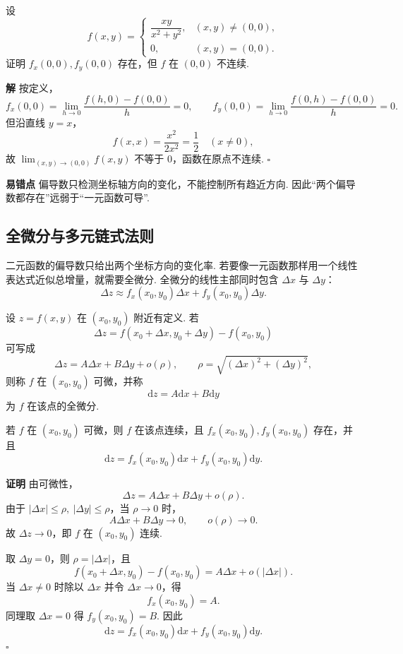 \documentclass[fontset=fandol]{ctexart}
\newenvironment{proofdetail}{\par\noindent\textbf{证明}\quad}{\hfill$\square$\par\vspace{0.8em}}
\newenvironment{solution}{\par\noindent\textbf{解}\quad}{\hfill$\square$\par\vspace{0.8em}}
\newenvironment{warning}{\par\noindent\textbf{易错点}\quad}{\par\vspace{0.8em}}
\newcommand{\dd}{\mathrm{d}}
\begin{document}
\begin{example}[偏导存在不推出连续]
设
\[
f(x,y)=
\begin{cases}
\dfrac{xy}{x^2+y^2},&(x,y)\neq(0,0),\\[0.6em]
0,&(x,y)=(0,0).
\end{cases}
\]
证明 $f_x(0,0),f_y(0,0)$ 存在，但 $f$ 在 $(0,0)$ 不连续.
\end{example}
\begin{solution}
按定义，
\[
f_x(0,0)=\lim_{h\to0}\frac{f(h,0)-f(0,0)}{h}=0,\qquad
f_y(0,0)=\lim_{h\to0}\frac{f(0,h)-f(0,0)}{h}=0.
\]
但沿直线 $y=x$，
\[
f(x,x)=\frac{x^2}{2x^2}=\frac12\quad(x\neq0),
\]
故 $\lim_{(x,y)\to(0,0)}f(x,y)$ 不等于 $0$，函数在原点不连续.
\end{solution}
\begin{warning}
偏导数只检测坐标轴方向的变化，不能控制所有趋近方向. 因此“两个偏导数都存在”远弱于“一元函数可导”.
\end{warning}

\subsection{全微分与多元链式法则}

二元函数的偏导数只给出两个坐标方向的变化率. 若要像一元函数那样用一个线性表达式近似总增量，就需要全微分. 全微分的线性主部同时包含 $\Delta x$ 与 $\Delta y$：
\[
\Delta z\approx f_x(x_0,y_0)\Delta x+f_y(x_0,y_0)\Delta y.
\]

\begin{definition}[二元函数可微与全微分]
设 $z=f(x,y)$ 在 $(x_0,y_0)$ 附近有定义. 若
\[
\Delta z=f(x_0+\Delta x,y_0+\Delta y)-f(x_0,y_0)
\]
可写成
\[
\Delta z=A\Delta x+B\Delta y+o(\rho),
\qquad \rho=\sqrt{(\Delta x)^2+(\Delta y)^2},
\]
则称 $f$ 在 $(x_0,y_0)$ 可微，并称
\[
\dd z=A\dd x+B\dd y
\]
为 $f$ 在该点的全微分.
\end{definition}

\begin{theorem}[可微推出连续且偏导存在]
若 $f$ 在 $(x_0,y_0)$ 可微，则 $f$ 在该点连续，且 $f_x(x_0,y_0),f_y(x_0,y_0)$ 存在，并且
\[
\dd z=f_x(x_0,y_0)\dd x+f_y(x_0,y_0)\dd y.
\]
\end{theorem}
\begin{proofdetail}
由可微性，
\[
\Delta z=A\Delta x+B\Delta y+o(\rho).
\]
由于 $|\Delta x|\leq\rho,\ |\Delta y|\leq\rho$，当 $\rho\to0$ 时，
\[
A\Delta x+B\Delta y\to0,\qquad o(\rho)\to0.
\]
故 $\Delta z\to0$，即 $f$ 在 $(x_0,y_0)$ 连续.

取 $\Delta y=0$，则 $\rho=|\Delta x|$，且
\[
f(x_0+\Delta x,y_0)-f(x_0,y_0)=A\Delta x+o(|\Delta x|).
\]
当 $\Delta x\neq0$ 时除以 $\Delta x$ 并令 $\Delta x\to0$，得
\[
f_x(x_0,y_0)=A.
\]
同理取 $\Delta x=0$ 得 $f_y(x_0,y_0)=B$. 因此
\[
\dd z=f_x(x_0,y_0)\dd x+f_y(x_0,y_0)\dd y.
\]
\end{proofdetail}
\end{document}
